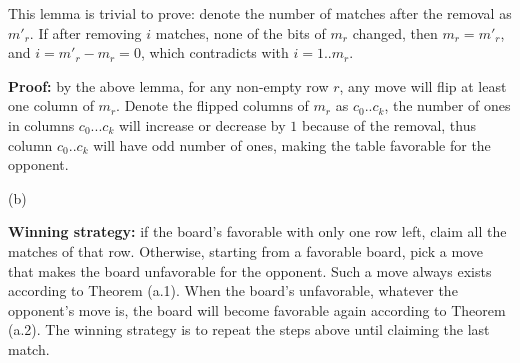 \documentclass{article}
\begin{document}
\begin{description}
  This lemma is trivial to prove: denote the number of matches after the removal as $m'_r$. If after removing $i$ matches, none of the bits of $m_r$ changed, then $m_r = m'_r$, and $i = m'_r - m_r = 0$, which contradicts with $i=1..m_r$.

  \textbf{Proof:} by the above lemma, for any non-empty row $r$, any move will flip at least one column of $m_r$. Denote the flipped columns of $m_r$ as $c_0..c_k$, the number of ones in columns $c_0...c_k$ will increase or decrease by $1$ because of the removal, thus column $c_0..c_k$ will have odd number of ones, making the table favorable for the opponent.

  (b) 

  \textbf{Winning strategy:} if the board's favorable with only one row left, claim all the matches of that row. Otherwise, starting from a favorable board, pick a move that makes the board unfavorable for the opponent. Such a move always exists according to Theorem (a.1). When the board's unfavorable, whatever the opponent's move is, the board will become favorable again according to Theorem (a.2). The winning strategy is to repeat the steps above until claiming the last match.

\end{description}
\end{document}
